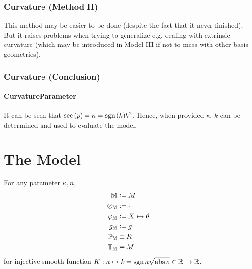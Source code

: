 \documentclass[stu, babel, american, biblatex, a4paper, leqno, draftall]{apa7}
\begin{document}
\subsubsection{Curvature (Method II)}
This method may be easier to be done
(despite the fact that it never finished).
But it raises problems when trying to generalize e.g. dealing with extrinsic curvature
(which may be introduced in Model III
if not to mess with other basis geometries).
\begin{lemma}\label{Model:ChristoffelSymbol}

\end{lemma}
\begin{lemma}\label{Model:RiemannCurvatureTensor}

\end{lemma}
\subsubsection{Curvature (Conclusion)}
\begin{lemma}\label{Model:SectionalCurvature}

\end{lemma}
\paragraph{CurvatureParameter}
It can be seen that $\operatorname{sec}\left(p\right) = \kappa = \operatorname{sgn}{\left(k\right)}k^2$.
Hence, when provided $\kappa$, $k$ can be determined and used to evaluate the model.
\section{The Model}
\begin{ModelGroupElement}
    For any parameter $\kappa, n$,
    \begin{align*}
        \elements                   & \defeq M                                    \\
        \groupoperation{\elements}  & \defeq \cdot                                \\
        \charts{\elements}          & \defeq \tensor{X}{}\mapsto\tensor{\theta}{} \\
        \innerprod{\elements}       & \defeq g                                    \\
        \points{\elements}          & \equiv R                                    \\
        \transformations{\elements} & \equiv M                                    \\
    \end{align*}
    for injective smooth function $K:\kappa \mapsto k = \operatorname{sgn}{\kappa}\sqrt{\operatorname{abs}{\kappa}}\in\mathbb{R}\to\mathbb{R}$.
\end{ModelGroupElement}
\begin{ModelGroupAssertion}
\end{ModelGroupAssertion}
\begin{ModelCurvatureAssertion}
\end{ModelCurvatureAssertion}
\end{document}
